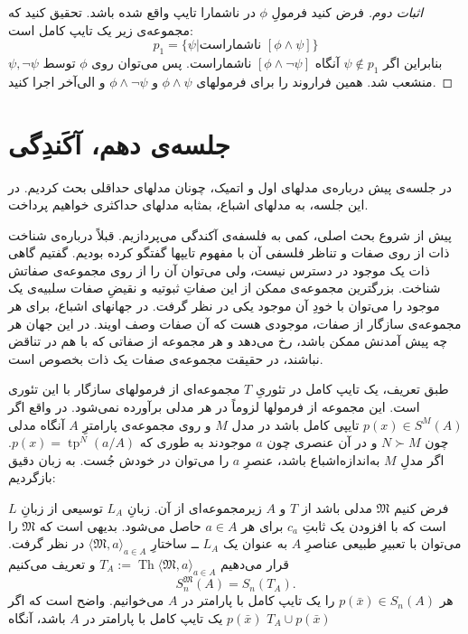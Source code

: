 \documentclass[12pt,a4paper]{article}
\theoremstyle{colorhead}
\DeclareMathOperator{\Th}{Th}
\DeclareMathOperator{\tp}{tp}
\begin{document}
\begin{proof}[اثبات دوم]
فرض کنید فرمولِ
$\phi$
در ناشمارا تایپ واقع شده باشد. تحقیق کنید که مجموعه‌ی زیر یک تایپ کامل است:
\[
p_1=\{\psi| \text{ناشماراست }[\phi\wedge\psi]\}
\]
بنابراین اگر
$\psi\not\in p_1$
آنگاه
$[\phi\wedge\neg\psi]$
ناشماراست. پس می‌توان روی
$\phi$
توسط
$\psi,\neg\psi$
منشعب شد. همین فراروند را برای فرمولهای
$\phi\wedge\psi$
و 
$\phi\wedge\neg\psi$
و الی‌آخر اجرا کنید. 

\end{proof}
\pagebreak
\section{جلسه‌ی دهم، آکَندِگی}
در جلسه‌ی پیش درباره‌ی 
مدلهای اول و اتمیک، چونان
مدلهای حداقلی بحث کردیم. در این جلسه، به مدلهای اشباع، بمثابه مدلهای حداکثری خواهیم پرداخت.
\par 
پیش از شروع بحث اصلی، کمی به فلسفه‌ی آکندگی می‌پردازیم. 
قبلاً درباره‌ی شناخت ذات از روی صفات و تناظر فلسفی آن با مفهوم تایپها گفتگو کرده‌ بودیم. گفتیم
گاهی ذات یک موجود در دسترس نیست، ولی می‌توان آن را از روی مجموعه‌ی صفاتش شناخت.  بزرگترین مجموعه‌ی ممکن از این صفاتِ ثبوتیه  و نقیضِ‌ صفات سلبیه‌ی یک موجود را می‌توان با خودِ آن موجود یکی در نظر گرفت. در جهانهای اشباع، برای هر مجموعه‌ی سازگار از صفات، موجودی هست که آن صفات وصف اویند.
در این جهان هر چه پیش آمدنش ممکن باشد، رخ می‌دهد و هر مجموعه‌ از صفاتی که با هم در تناقض نباشند، در حقیقت مجموعه‌ی صفات یک ذات بخصوص است. 
\par 
طبق تعریف، یک تایپ کامل در تئوریِ
$T$
 مجموعه‌ای از فرمولهای سازگار با این تئوری است. این مجموعه از فرمولها لزوماً در هر مدلی برآورده نمی‌شود. در واقع اگر
 $p(x)\in S^M(A)$
 تایپی کامل باشد در مدل 
 $M$
 و روی مجموعه‌ی پارامترِ
 $A$
 آنگاه مدلی چون
 $N\succ M$
 و در آن عنصری چون
 $a$
 موجودند به طوری که
 $p(x)=\tp^N(a/A)$.
 اگر مدلِ
 $M$
 به‌اندازه‌اشباع باشد، عنصرِ
 $a$
 را می‌توان در خودش جُست. به زبان دقیق بازگردیم:
 \par 
فرض کنیم
$\mathfrak{M}$
مدلی باشد از
$T$
و 
$A$
زیرمجموعه‌ای از آن. زبانِ
$L_A$
توسیعی از زبانِ
$L$
است که با افزودن یک ثابتِ
$c_a$
برای هر
$a\in A$
حاصل می‌شود. بدیهی است که 
$\mathfrak{M}$
را می‌توان با تعبیرِ طبیعی عناصرِ
$A$
به عنوان یک
$L_A$
ــ‌
ساختارِ
$\langle \mathfrak{M},a\rangle_{a\in A}$
 در نظر گرفت. قرار می‌دهیم
\mbox{$T_A:=\Th\langle \mathfrak{M},a\rangle_{a\in A}$}
 و تعریف می‌کنیم
\[S_n^\mathfrak{M}(A)=S_n(T_A).\]
هر
$p(\bar{x})\in S_n(A)$
را یک تایپ کامل با پارامتر در
$A$
می‌خوانیم. واضح است که اگر
$p(\bar{x})$
یک تایپ کامل با پارامتر در
$A$
باشد، آنگاه
$T_A\cup p(\bar{x})$
\end{document}
